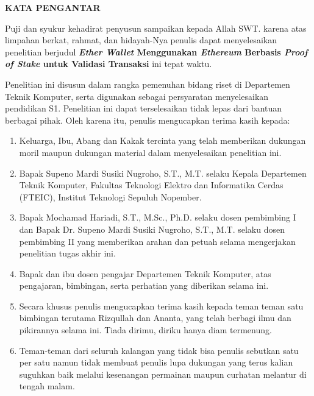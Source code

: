 \begin{center}
  \Large
  \textbf{KATA PENGANTAR}
\end{center}


\vspace{2ex}


Puji dan syukur kehadirat penyusun sampaikan kepada Allah SWT. karena atas limpahan berkat, rahmat, dan hidayah-Nya penulis dapat menyelesaikan penelitian berjudul \textbf{ \emph{Ether Wallet} Menggunakan \emph{Ethereum} Berbasis \emph{Proof of Stake} untuk Validasi Transaksi} ini tepat waktu.

Penelitian ini disusun dalam rangka pemenuhan bidang riset di Departemen Teknik Komputer, serta digunakan sebagai persyaratan menyelesaikan pendidikan S1. Penelitian ini dapat terselesaikan tidak lepas dari bantuan berbagai pihak. Oleh karena itu, penulis mengucapkan terima kasih kepada:

\begin{enumerate}[nolistsep]

  \item Keluarga, Ibu, Abang dan Kakak tercinta yang telah memberikan dukungan moril maupun dukungan material dalam menyelesaikan penelitian ini. 

  \item Bapak Supeno Mardi Susiki Nugroho, S.T., M.T. selaku Kepala Departemen Teknik Komputer, Fakultas Teknologi Elektro dan Informatika Cerdas (FTEIC), Institut Teknologi Sepuluh Nopember.

  \item Bapak Mochamad Hariadi, S.T., M.Sc., Ph.D. selaku dosen pembimbing I dan Bapak Dr. Supeno Mardi Susiki Nugroho, S.T., M.T. selaku  dosen pembimbing II yang memberikan arahan dan petuah selama mengerjakan penelitian tugas akhir ini. 

 \item Bapak dan ibu dosen pengajar Departemen Teknik Komputer, atas pengajaran, bimbingan, serta perhatian yang diberikan selama ini.

 \item Secara khusus penulis mengucapkan terima kasih kepada teman teman satu bimbingan terutama Rizqullah dan Ananta, yang telah berbagi ilmu dan pikirannya selama ini. Tiada dirimu, diriku hanya diam termenung.

 \item Teman-teman dari seluruh kalangan yang tidak bisa penulis sebutkan satu per satu namun tidak membuat penulis lupa dukungan yang terus kalian suguhkan baik melalui kesenangan permainan maupun curhatan melantur di tengah malam.	 

\end{enumerate}

